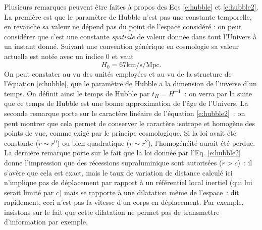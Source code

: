 Plusieurs remarques peuvent être faites à propos des Eqs \ref{e:hubble} et \ref{e:hubble2}.  La première est que le paramètre de Hubble n'est pas une constante temporelle, en revanche sa valeur ne dépend pas du point de l'espace considéré : on peut considérer que c'est une constante \textit{spatiale} de valeur donnée dans tout l'Univers à un instant donné. Suivant une convention générique en cosmologie sa valeur actuelle est notée avec un indice 0 et vaut
\begin{equation}
H_0 = 67 \mathrm{km/s/Mpc}.
\end{equation}
On peut constater au vu des unités employées et au vu de la structure de l'équation \ref{e:hubble}, que le paramètre de Hubble a la dimension de l'inverse d'un temps. On définit ainsi le temps de Hubble par $t_H=H^{-1}$~: on verra par la suite que ce temps de Hubble est une bonne approximation de l'âge de l'Univers. La seconde remarque porte sur le caractère linéaire de l'équation \ref{e:hubble2}~: on peut montrer que cela permet de conserver le caractère isotrope et homogène des points de vue, comme exigé par le principe cosmologique. Si la loi avait été constante ($\dot r \sim r^0$) ou bien quadratique ($\dot r\sim r^2$), l'homogénéité aurait été perdue. La dernière remarque porte sur le fait que la loi donnée par l'Eq. \ref{e:hubble2} donne l'impression que des récessions supraluminique sont autorisées ($\dot r>c$)~: il s'avère que cela est exact, mais le taux de variation de distance calculé ici n'implique pas de déplacement par rapport à un référentiel local inertiel (qui lui serait limité par $c$) mais se rapporte à une dilatation  même de l'espace~: dit rapidement, ceci n'est pas la vitesse d'un corps en déplacement. Par exemple, insistons sur le fait que cette dilatation ne permet pas de transmettre d'information par exemple.

